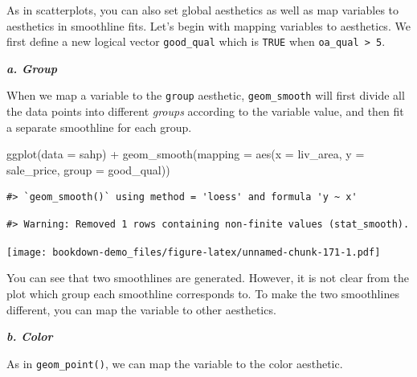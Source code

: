 \documentclass[
]{book}
\newenvironment{Shaded}{\begin{snugshade}}{\end{snugshade}}
\newcommand{\AttributeTok}[1]{\textcolor[rgb]{0.77,0.63,0.00}{#1}}
\newcommand{\DecValTok}[1]{\textcolor[rgb]{0.00,0.00,0.81}{#1}}
\newcommand{\FunctionTok}[1]{\textcolor[rgb]{0.00,0.00,0.00}{#1}}
\newcommand{\NormalTok}[1]{#1}
\newcommand{\OtherTok}[1]{\textcolor[rgb]{0.56,0.35,0.01}{#1}}
\newcommand{\SpecialCharTok}[1]{\textcolor[rgb]{0.00,0.00,0.00}{#1}}
\begin{document}
As in scatterplots, you can also set global aesthetics as well as map variables to aesthetics in smoothline fits. Let's begin with mapping variables to aesthetics. We first define a new logical vector \texttt{good\_qual} which is \texttt{TRUE} when \texttt{oa\_qual\ \textgreater{}\ 5}.

\begin{Shaded}
\end{Shaded}

\textbf{\emph{a. Group}}

When we map a variable to the \texttt{group} aesthetic, \texttt{geom\_smooth} will first divide all the data points into different \emph{groups} according to the variable value, and then fit a separate smoothline for each group.

\begin{Shaded}
\begin{Highlighting}[]
\FunctionTok{ggplot}\NormalTok{(}\AttributeTok{data =}\NormalTok{ sahp) }\SpecialCharTok{+} \FunctionTok{geom\_smooth}\NormalTok{(}\AttributeTok{mapping =} \FunctionTok{aes}\NormalTok{(}\AttributeTok{x =}\NormalTok{ liv\_area, }\AttributeTok{y =}\NormalTok{ sale\_price, }\AttributeTok{group =}\NormalTok{ good\_qual))}
\end{Highlighting}
\end{Shaded}

\begin{verbatim}
#> `geom_smooth()` using method = 'loess' and formula 'y ~ x'
\end{verbatim}

\begin{verbatim}
#> Warning: Removed 1 rows containing non-finite values (stat_smooth).
\end{verbatim}

\texttt{[image: bookdown-demo\_files/figure-latex/unnamed-chunk-171-1.pdf]}

You can see that two smoothlines are generated. However, it is not clear from the plot which group each smoothline corresponds to. To make the two smoothlines different, you can map the variable to other aesthetics.

\textbf{\emph{b. Color}}

As in \texttt{geom\_point()}, we can map the variable to the color aesthetic.
\end{document}
